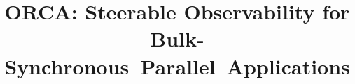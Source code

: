 \documentclass[conference]{ieee-template/IEEEtran}
\begin{document}
\renewcommand\linenumberfont{\normalfont\tiny\color{red}}
\linenumbers

\title{ORCA: Steerable Observability for Bulk-Synchronous~Parallel~Applications}


\author{}

\maketitle














\renewcommand*{\bibfont}{\small}
\printbibliography{}

% 
\end{document}
